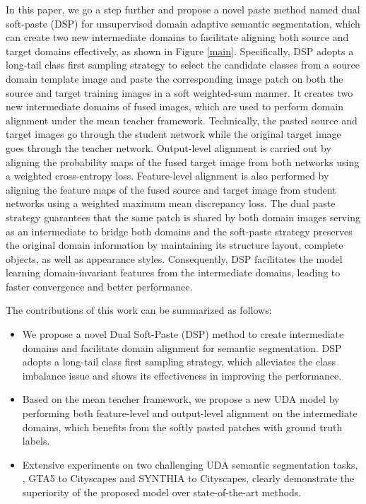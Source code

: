 \documentclass[sigconf]{acmart}
\begin{document}
In this paper, we go a step further and propose a novel paste method named dual soft-paste (DSP) for unsupervised domain adaptive semantic segmentation, which can create two new intermediate domains to facilitate aligning both source and target domains effectively, as shown in Figure \ref{main}. Specifically, DSP adopts a long-tail class first sampling strategy to select the candidate classes from a source domain template image and paste the corresponding image patch on both the source and target training images in a soft weighted-sum manner. It creates two new intermediate domains of fused images, which are used to perform domain alignment under the mean teacher framework. Technically, the pasted source and target images go through the student network while the original target image goes through the teacher network. Output-level alignment is carried out by aligning the probability maps of the fused target image from both networks using a weighted cross-entropy loss. Feature-level alignment is also performed by aligning the feature maps of the fused source and target image from student networks using a weighted maximum mean discrepancy loss. The dual paste strategy guarantees that the same patch is shared by both domain images serving as an intermediate to bridge both domains and the soft-paste strategy preserves the original domain information by maintaining its structure layout, complete objects, as well as appearance styles. Consequently, DSP facilitates the model learning domain-invariant features from the intermediate domains, leading to faster convergence and better performance. 

The contributions of this work can be summarized as follows:
\begin{itemize}
    \item We propose a novel Dual Soft-Paste (DSP) method to create intermediate domains and facilitate domain alignment for semantic segmentation. DSP adopts a long-tail class first sampling strategy, which alleviates the class imbalance issue and shows its effectiveness in improving the performance.
    
    \item Based on the mean teacher framework, we propose a new UDA model by performing both feature-level and output-level alignment on the intermediate domains, which benefits from the softly pasted patches with ground truth labels. 
    
    \item Extensive experiments on two challenging UDA semantic segmentation tasks, , GTA5 to Cityscapes and SYNTHIA to Cityscapes, clearly demonstrate the superiority of the proposed model over state-of-the-art methods.
\end{itemize}
\end{document}
